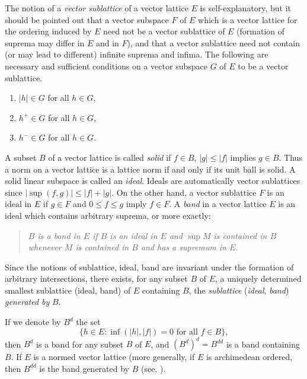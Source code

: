 The notion of a \emph{vector sublattice} of a vector lattice $ E $ is self-explanatory, but it should be pointed out that a vector subspace $ F $ of\/ $ E $ which is a vector lattice for the ordering induced by $ E $ need not be a vector sublattice of\/ $ E $ (formation of suprema may differ in $ E $ and in $ F $), and that a vector sublattice need not contain (or may lead to different) infinite suprema and infima.
The following are necessary and sufficient conditions on a vector subspace $ G $ of\/ $ E $ to be a vector sublattice.
\begin{enumerate}[\upshape (a)]
	\item 
	$ |h| \in G $ for all $ h \in G $, 

	\item 
	$ h^{+} \in G $ for all $ h \in G $, 
	
	\item 
	$ h^{-} \in G $ for all $ h \in G $.
\end{enumerate}
A subset $ B $ of a vector lattice is called \emph{solid} if\/ $ f \in B $, $ |g| \leq |f| $ implies $ g \in B $.
Thus a norm on a vector lattice is a lattice norm if and only if its unit ball is solid.
A solid linear subspace is called an \emph{ideal}.
Ideals are automatically vector sublattices since $ |\sup(f,g)| \leq |f| + |g| $.
On the other hand, a vector sublattice $ F $ is an ideal in $ E $ if\/ $ g \in F $ and $ 0 \leq f \leq g $ imply $ f \in F $.
A \emph{band} in a vector lattice $ E $ is an ideal which contains arbitrary suprema, or more exactly: 
\begin{quote}
\textit{$ B $ is a band in $ E $ if\/ $ B $ is an ideal in $ E $ and $ \sup M $ is contained in $ B $ whenever $ M $ is contained in $ B $ and has a supremum in $ E $.}
\end{quote}
Since the notions of sublattice, ideal, band are invariant under the formation of arbitrary intersections, there exists, for any subset $ B $ of\/ $ E $, a uniquely determined smallest sublattice (ideal, band) of\/ $ E $ containing $ B $, \ie the \emph{sublattice} (\emph{ideal}, \emph{band}) \emph{generated by} $ B $.

If we denote by $ B^{d} $ the set 
\[
\{h \in E \colon \inf(|h|,|f|) = 0 \text{ for all $f \in B$}\},
\]
then $ B^{d} $ is a band for any subset $ B $ of\/ $ E $, and $ (B^{d})^{d} = B^{dd} $ is a band containing $ B $.
If\/ $ E $ is a normed vector lattice (more generally, if\/ $ E $ is archimedean ordered, then $ B^{dd} $ is the band generated by $ B $ (see, \eg \textcite{schaefer:1974}).

